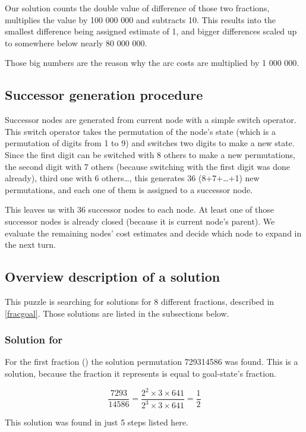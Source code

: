 \documentclass{article}
\begin{document}
Our solution counts the double value of difference of those two fractions,
multiplies the value by 100 000 000 and subtracts 10. This results into the
smallest difference being assigned estimate of 1, and bigger differences scaled
up to somewhere below nearly 80 000 000.

Those big numbers are the reason why the arc costs are multiplied by 1 000 000.

\subsection{Successor generation procedure}

Successor nodes are generated from current node with a simple switch operator.
This switch operator takes the permutation of the node's state (which is a
permutation of digits from 1 to 9) and switches two digits to make a new state.
Since the first digit can be switched with 8 others to make a new permutations,
the second digit with 7 others (because switching with the first digit
was done already), third one with 6 others\ldots, this generates 36
(8+7+\ldots+1) new permutations, and each one of them is assigned to a successor
node.

This leaves us with 36 successor nodes to each node. At least one of those
successor nodes is already closed (because it is current node's parent). We
evaluate the remaining nodes' cost estimates and decide which node to expand in
the next turn.

\subsection{Overview description of a solution}

This puzzle is searching for solutions for 8 different fractions, described in
\ref{fracgoal}.
Those solutions are listed in the subsections below.

\subsubsection{Solution for }

For the first fraction () the solution permutation 729314586 was
found. This is a solution, because the fraction it represents is equal to
goal-state's fraction.

\[\frac{7293}{14586} = \frac{2^2 \times 3 \times 641}{2^3 \times 3 \times 641} =
\frac{1}{2}\]

This solution was found in just 5 steps listed here.
\end{document}
